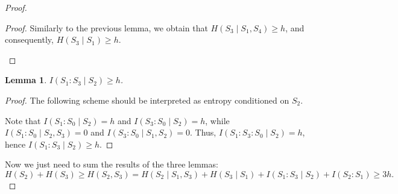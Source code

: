 \documentclass[12pt,sans]{article}
\theoremstyle{definition}
\theoremstyle{plain}
\newtheorem{lemma}{Lemma}[section]
\theoremstyle{remark}
\begin{document}
\begin{proof}
    \begin{proof}
        Similarly to the previous lemma, we obtain that $H(S_3 \mid S_1, S_4) \ge h$, and consequently,
        $H(S_3 \mid S_1) \ge h$.
        \begin{center}
        \end{center}
    \end{proof}

    \begin{lemma}\label{lm:secret4:l3}
        $I(S_1 : S_3 \mid S_2) \ge h$.
    \end{lemma}

    \begin{proof}
        The following scheme should be interpreted as entropy conditioned on $S_2$.
        \begin{center}
        \end{center}
        Note that $I(S_1 : S_0 \mid S_2) = h$ and $I(S_3 : S_0 \mid S_2) = h$, while
        $I(S_1 : S_0 \mid S_2, S_3) = 0$ and $I(S_3 : S_0 \mid S_1, S_2) = 0$.
        Thus, $I(S_1 : S_3 : S_0 \mid S_2) = h$, hence $I(S_1 : S_3 \mid S_2) \ge h$.
    \end{proof}

    Now we just need to sum the results of the three lemmas:
    \[
    H(S_2) + H(S_3) \ge H(S_2, S_3) = H(S_2 \mid S_1, S_3) + H(S_3 \mid S_1) + I(S_1 : S_3 \mid S_2) +
    I(S_2 : S_1) \ge 3h.
    \]
\end{proof}
\end{document}
